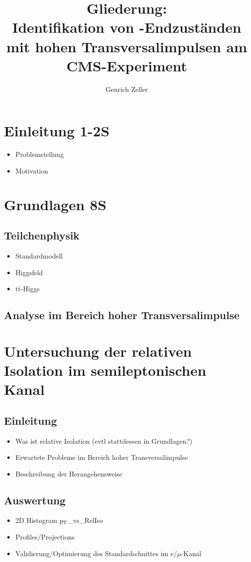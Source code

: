\documentclass[12pt,a4paper]{article}
\title{Gliederung:\\\textbf{Identifikation von \tth -Endzuständen mit hohen Transversalimpulsen am CMS-Experiment}}
\author{Genrich Zeller}
\newcommand{\ttbar}{$\text{t} \bar{ \text{t}}$}
\newcommand{\pt}{$p_{\text T}$}
\begin{document}
\maketitle
\section{Einleitung \hspace*{11cm} 1-2S}
\begin{itemize}
\item Problemstellung
\item Motivation
\end{itemize}
\section{Grundlagen \hspace*{11cm} 8S}
\subsection{Teilchenphysik}
\begin{itemize}
\item Standardmodell
\item Higgsfeld
\item \ttbar -Higgs
\end{itemize}
\subsection{Analyse im Bereich hoher Transversalimpulse}
\section{Untersuchung der relativen Isolation im semileptonischen Kanal}
\subsection{Einleitung}
\begin{itemize}
\item Was ist relative Isolation (evtl stattdessen in Grundlagen?)
\item Erwartete Probleme im Bereich hoher Transversalimpulse
\item Beschreibung der Herangehensweise
\end{itemize}
\subsection{Auswertung}
\begin{itemize}
\item 2D Histogram \pt \_vs\_RelIso
\item Profiles/Projections
\item Validierung/Optimierung des Standardschnittes im e/$\mu$-Kanal
\end{itemize}
\end{document}
